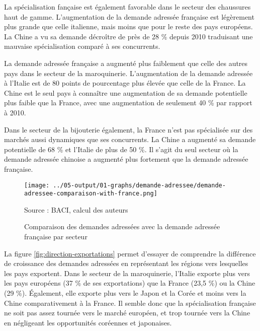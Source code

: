 \documentclass[french,10pt,a4paper]{article}
\begin{document}
La spécialisation fançaise est également favorable dans le secteur des chaussures haut de gamme. L'augmentation de la demande adressée française est légèrement plus grande que celle italienne, mais moins que pour le reste des pays européens. La Chine a vu sa demande décroître de près de 28 \% depuis 2010 traduisant une mauvaise spécialisation comparé à ses concurrents.

La demande adressée française a augmenté plus faiblement que celle des autres pays dans le secteur de la maroquinerie. L'augmentation de la demande adressée à l'Italie est de 80 points de pourcentage plus élevée que celle de la France. La Chine est le seul pays à connaître une augmentation de sa demande potentielle plus faible que la France, avec une augmentation de seulement 40 \% par rapport à 2010.

Dans le secteur de la bijouterie également, la France n'est pas spécialisée sur des marchés aussi dynamiques que ses concurrents. La Chine a augmenté sa demande potentielle de 68 \% et l'Italie de plus de 50 \%. Il s'agit du seul secteur où la demande adressée chinoise a augmenté plus fortement que la demande adressée française. 


\begin{figure}[!h]
  \centering
  \texttt{[image: ../05-output/01-graphs/demande-adressee/demande-adressee-comparaison-with-france.png]}
  \captionsetup{justification=raggedright,singlelinecheck=false, font=small}
  \caption*{Source : BACI, calcul des auteurs}
  \captionsetup{justification=centering, singlelinecheck=true, font=normalsize}
  \caption{Comparaison des demandes adressées avec la demande adressée française par secteur}
  \label{fig:demande-adressee}
\end{figure}

\bigskip
La figure \ref{fig:direction-exportations} permet d'essayer de comprendre la différence de croissance des demandes adressées en représentant les régions vers lesquelles les pays exportent. Dans le secteur de la maroquinerie, l'Italie exporte plus vers les pays européens (37 \% de ses exportations) que la France (23,5 \%) ou la Chine (29 \%). Également, elle exporte plus vers le Japon et la Corée et moins vers la Chine comparativement à la France. Il semble donc que la spécialisation française ne soit pas assez tournée vers le marché européen, et trop tournée vers la Chine en négligeant les opportunités coréennes et japonaises.
\end{document}
